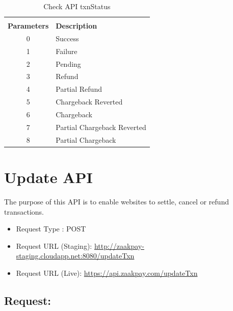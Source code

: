 \documentclass{article}
\begin{document}
\begin{longtable}{||c|| p{12.5cm}||}
\rowcolor{white}
\caption{Check API txnStatus}\\
\rowcolor{green!50}
\bfseries{Parameters} & \bfseries{Description} \\ \hline
0 & Success \\
1 & Failure \\
2 & Pending \\
3 & Refund \\
4 & Partial Refund \\
5 & Chargeback Reverted \\
6 & Chargeback \\
7 & Partial Chargeback Reverted \\
8 & Partial Chargeback \\

\end{longtable}
\newpage

\section{Update API}
The purpose of this API is to enable websites to settle, cancel or refund transactions.
\begin{itemize}
\item Request Type : POST
\item Request URL (Staging): \url{http://zaakpay-staging.cloudapp.net:8080/updateTxn}
\item Request URL (Live): \url{https://api.zaakpay.com/updateTxn}
\end{itemize}

\subsection{Request:}
\end{document}
